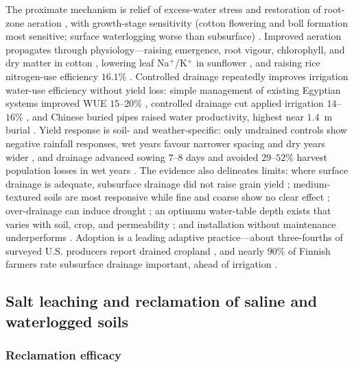The proximate mechanism is relief of excess-water stress and restoration of
root-zone aeration \parencite{BENNETT1982,DarziNaftchali2014}, with growth-stage
sensitivity (cotton flowering and boll formation most sensitive; surface
waterlogging worse than subsurface) \parencite{Qian2021}. Improved aeration
propagates through physiology---raising emergence, root vigour, chlorophyll, and
dry matter in cotton \parencite{Yang2022}, lowering leaf Na$^+$/K$^+$ in
sunflower \parencite{Islam2022}, and raising rice nitrogen-use efficiency
$16.1\%$ \parencite{DarziNaftchali2022b}. Controlled drainage repeatedly
improves irrigation water-use efficiency without yield loss: simple management
of existing Egyptian systems improved WUE $15$--$20\%$ \parencite{Wahba2005},
controlled drainage cut applied irrigation $14$--$16\%$ \parencite{Mahmoud2021},
and Chinese buried pipes raised water productivity, highest near $1.4$~m burial
\parencite{Liu2025}. Yield response is soil- and weather-specific: only
undrained controls show negative rainfall responses, wet years favour narrower
spacing and dry years wider \parencite{Rui2024,Kladivko2005,Acharya2019}, and
drainage advanced sowing $7$--$8$ days and avoided $29$--$52\%$ harvest
population losses in wet years \parencite{Mourtzinis2021,Nelson2011}. The
evidence also delineates limits: where surface drainage is adequate, subsurface
drainage did not raise grain yield \parencite{Wiersma2010}; medium-textured
soils are most responsive while fine and coarse show no clear effect
\parencite{Singh2022b}; over-drainage can induce drought
\parencite{Cordeiro2015,DeBoer2006}; an optimum water-table depth exists that
varies with soil, crop, and permeability \parencite{HOOGHOUDT1952,Bigelow2001};
and installation without maintenance underperforms \parencite{Malota2016}.
Adoption is a leading adaptive practice---about three-fourths of surveyed U.S.
producers report drained cropland \parencite{Morton2015}, and nearly $90\%$ of
Finnish farmers rate subsurface drainage important, ahead of irrigation
\parencite{PeltonenSainio2021}.

\subsection{Salt leaching and reclamation of saline and waterlogged soils}

\subsubsection{Reclamation efficacy}

